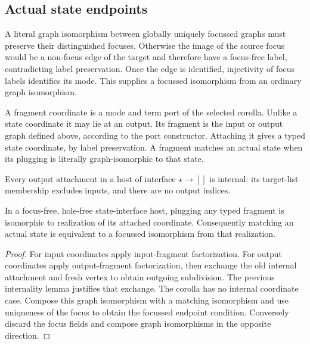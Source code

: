 \subsection{Actual state endpoints}
A literal graph isomorphism between globally uniquely focussed graphs must
preserve their distinguished focuses. Otherwise the image of the source focus
would be a non-focus edge of the target and therefore have a focus-free label,
contradicting label preservation. Once the edge is identified, injectivity of
focus labels identifies its mode. This supplies a focussed isomorphism from
an ordinary graph isomorphism.
\begin{definition}\label{term:pattern-matching}
A fragment coordinate is a mode and term port of the selected corolla.
Unlike a state coordinate it may lie at an output. Its fragment is the input
or output graph defined above, according to the port constructor. Attaching
it gives a typed state coordinate, by label preservation. A fragment matches
an actual state when its plugging is literally graph-isomorphic to that state.
\end{definition}
Every output attachment in a host of interface $\star\to[]$ is internal:
its target-list membership excludes inputs, and there are no output indices.
\begin{theorem}
In a focus-free, hole-free state-interface host, plugging any typed fragment
is isomorphic to realization of its attached coordinate. Consequently matching
an actual state is equivalent to a focussed isomorphism from that realization.
\end{theorem}
\begin{proof}
For input coordinates apply input-fragment factorization. For output
coordinates apply output-fragment factorization, then exchange the old
internal attachment and fresh vertex to obtain outgoing subdivision.
The previous internality lemma justifies that exchange. The corolla has no
internal coordinate case. Compose this graph isomorphism with a matching
isomorphism and use uniqueness of the focus to obtain the focussed endpoint
condition. Conversely discard the focus fields and compose graph
isomorphisms in the opposite direction.
\end{proof}

